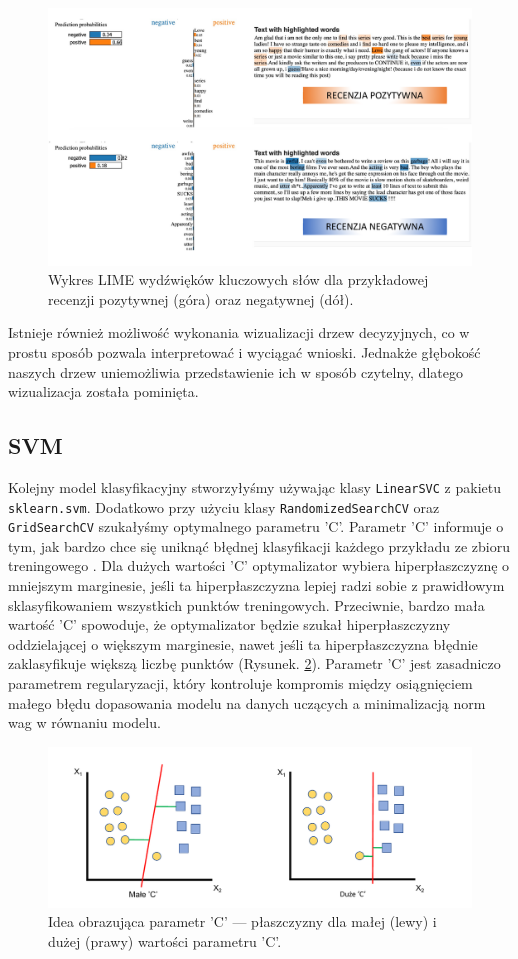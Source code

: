 \begin{figure}[H]
	\centering
	\includegraphics[width=0.8\linewidth]{images/chapter3/rf-lime.pdf}
	\caption{Wykres LIME wydźwięków kluczowych słów dla przykładowej recenzji pozytywnej (góra) oraz negatywnej (dół).}
	\label{fig:rf-lime}
\end{figure}

\noindent Istnieje również możliwość wykonania wizualizacji drzew decyzyjnych, co w prostu sposób pozwala interpretować i wyciągać wnioski. Jednakże głębokość naszych drzew uniemożliwia przedstawienie ich w sposób czytelny, dlatego wizualizacja została pominięta.

\subsection{SVM}
Kolejny model klasyfikacyjny stworzyłyśmy używając klasy \verb|LinearSVC| z pakietu \verb|sklearn.svm|. Dodatkowo przy użyciu klasy \verb|RandomizedSearchCV| oraz  \verb|GridSearchCV| szukałyśmy optymalnego parametru 'C'. Parametr 'C' informuje o tym, jak bardzo chce się uniknąć błędnej klasyfikacji każdego przykładu ze zbioru treningowego \cite{paramC}. Dla dużych wartości 'C' optymalizator wybiera hiperpłaszczyznę o mniejszym marginesie, jeśli ta hiperpłaszczyzna lepiej radzi sobie z prawidłowym sklasyfikowaniem wszystkich punktów treningowych. Przeciwnie, bardzo mała wartość 'C' spowoduje, że optymalizator będzie szukał hiperpłaszczyzny oddzielającej o większym marginesie, nawet jeśli ta hiperpłaszczyzna błędnie zaklasyfikuje większą liczbę punktów (Rysunek. \ref{fig:param-C}). Parametr 'C' jest zasadniczo parametrem regularyzacji, który kontroluje kompromis między osiągnięciem małego błędu dopasowania modelu na danych uczących a minimalizacją norm wag w równaniu modelu.

\begin{figure}[H]
	\centering
	\includegraphics[width=0.85\linewidth]{images/chapter3/param-C.pdf}
	\caption{Idea obrazująca parametr 'C' --- płaszczyzny dla małej (lewy) i dużej (prawy) wartości parametru 'C'.}
	\label{fig:param-C}
\end{figure}


